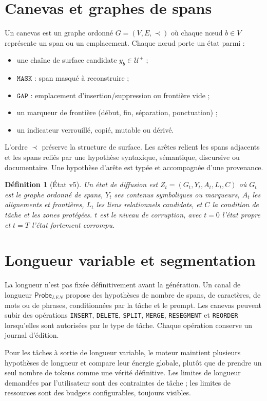 \documentclass[11pt,a4paper,oneside]{report}
\newtheorem{definition}{Définition}[chapter]
\newcommand{\Probe}{\mathsf{Probe}}
\newcommand{\Mask}{\mathtt{MASK}}
\newcommand{\Gap}{\mathtt{GAP}}
\begin{document}
\section{Canevas et graphes de spans}
Un canevas est un graphe ordonné $G=(V,E,\prec)$ où chaque nœud $b\in V$ représente un span ou un emplacement. Chaque nœud porte un état parmi :
\begin{itemize}
\item une chaîne de surface candidate $y_b\in\mathcal{U}^{+}$ ;
\item $\Mask$ : span masqué à reconstruire ;
\item $\Gap$ : emplacement d'insertion/suppression ou frontière vide ;
\item un marqueur de frontière (début, fin, séparation, ponctuation) ;
\item un indicateur verrouillé, copié, mutable ou dérivé.
\end{itemize}
L'ordre $\prec$ préserve la structure de surface. Les arêtes relient les spans adjacents et les spans reliés par une hypothèse syntaxique, sémantique, discursive ou documentaire. Une hypothèse d'arête est typée et accompagnée d'une provenance.

\begin{definition}[État v5]
Un état de diffusion est $Z_t=(G_t,Y_t,A_t,L_t,C)$ où $G_t$ est le graphe ordonné de spans, $Y_t$ ses contenus symboliques ou marqueurs, $A_t$ les alignements et frontières, $L_t$ les liens relationnels candidats, et $C$ la condition de tâche et les zones protégées. $t$ est le niveau de corruption, avec $t=0$ l'état propre et $t=T$ l'état fortement corrompu.
\end{definition}

\section{Longueur variable et segmentation}
La longueur n'est pas fixée définitivement avant la génération. Un canal de longueur $\Probe_{LEN}$ propose des hypothèses de nombre de spans, de caractères, de mots ou de phrases, conditionnées par la tâche et le prompt. Les canevas peuvent subir des opérations \texttt{INSERT}, \texttt{DELETE}, \texttt{SPLIT}, \texttt{MERGE}, \texttt{RESEGMENT} et \texttt{REORDER} lorsqu'elles sont autorisées par le type de tâche. Chaque opération conserve un journal d'édition.

Pour les tâches à sortie de longueur variable, le moteur maintient plusieurs hypothèses de longueur et compare leur énergie globale, plutôt que de prendre un seul nombre de tokens comme une vérité définitive. Les limites de longueur demandées par l'utilisateur sont des contraintes de tâche ; les limites de ressources sont des budgets configurables, toujours visibles.
\end{document}
